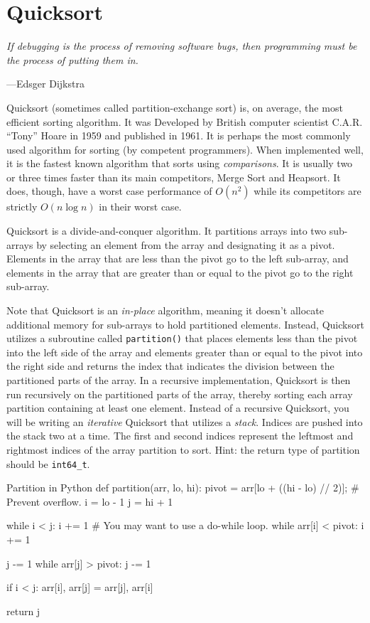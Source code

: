 \documentclass[11pt]{article}
\begin{document}
\section{Quicksort}

\epigraph{\emph{If debugging is the process of removing software bugs,
then programming must be the process of putting them in.}}{---Edsger
Dijkstra}

\noindent
Quicksort (sometimes called partition-exchange sort) is, on average, the most
efficient
sorting algorithm. It was Developed by British computer scientist C.A.R. ``Tony''
Hoare in 1959 and published in 1961. It is perhaps the most commonly used
algorithm for sorting (by competent programmers).  When implemented well, it is the fastest
known algorithm that sorts using \emph{comparisons}. It is
usually two or three times faster than its main competitors, Merge
Sort and Heapsort. It does, though, have a worst case performance
of $O(n^2)$ while its competitors are strictly $O(n \log n)$ in
their worst case.

Quicksort is a divide-and-conquer algorithm. It partitions
arrays into two sub-arrays by selecting an element from the array and
designating it as a pivot. Elements in the array that are less than the
pivot go to the left sub-array, and elements in the array that are
greater than or equal to the pivot go to the right sub-array.

Note that Quicksort is an \emph{in-place} algorithm, meaning it doesn't
allocate additional memory for sub-arrays to hold partitioned elements.
Instead, Quicksort utilizes a subroutine called \texttt{partition()}
that places elements less than the pivot into the left side of the array
and elements greater than or equal to the pivot into the right side and
returns the index that indicates the division between the partitioned
parts of the array. In a recursive implementation, Quicksort is then run
recursively on the partitioned parts of the array, thereby sorting each
array partition containing at least one element. Instead of a recursive
Quicksort, you will be writing an \emph{iterative} Quicksort that
utilizes a \emph{stack}. Indices are pushed into the stack two at a
time. The first and second indices represent the leftmost and rightmost
indices of the array partition to sort. Hint: the return type of
partition should be \texttt{int64\_t}.

\begin{pythonlisting}{Partition in Python}
def partition(arr, lo, hi):
    pivot = arr[lo + ((hi - lo) // 2)]; # Prevent overflow.
    i = lo - 1
    j = hi + 1

    while i < j:
        i += 1 # You may want to use a do-while loop.
        while arr[i] < pivot:
            i += 1

        j -= 1
        while arr[j] > pivot:
            j -= 1

        if i < j:
            arr[i], arr[j] = arr[j], arr[i]

    return j
\end{pythonlisting}
\end{document}

